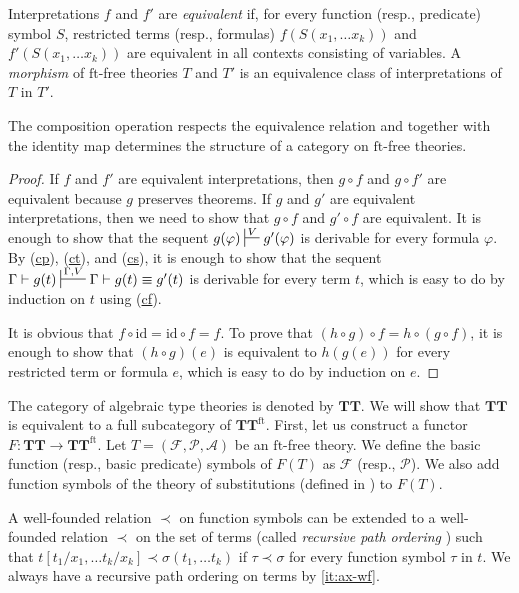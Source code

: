 \documentclass[reqno]{amsart}
\newcommand{\axref}[1]{(\hyperref[ax:#1]{#1})}
\theoremstyle{definition}
\theoremstyle{remark}
\newcommand{\fs}[1]{\mathrm{#1}}
\newcommand{\ft}{\fs{ft}}
\newcommand{\id}{\fs{id}}
\newcommand{\cat}[1]{\mathbf{#1}}
\newcommand{\algtt}{\cat{TT}}
\numberwithin{figure}{section}
\begin{document}
Interpretations $f$ and $f'$ are \emph{equivalent} if, for every function (resp., predicate) symbol $S$, restricted terms (resp., formulas) $f(S(x_1, \ldots x_k))$ and $f'(S(x_1, \ldots x_k))$ are equivalent in all contexts consisting of variables.
A \emph{morphism} of $\ft$-free theories $T$ and $T'$ is an equivalence class of interpretations of $T$ in $T'$.

\begin{prop}
The composition operation respects the equivalence relation and together with the identity map determines the structure of a category on $\ft$-free theories.
\end{prop}
\begin{proof}
If $f$ and $f'$ are equivalent interpretations, then $g \circ f$ and $g \circ f'$ are equivalent because $g$ preserves theorems.
If $g$ and $g'$ are equivalent interpretations, then we need to show that $g \circ f$ and $g' \circ f$ are equivalent.
It is enough to show that the sequent $g(\varphi) \sststile{}{V} g'(\varphi)$ is derivable for every formula $\varphi$.
By \axref{cp}, \axref{ct}, and \axref{cs}, it is enough to show that the sequent $\Gamma \vdash g(t) \sststile{}{\Gamma,V} \Gamma \vdash g(t) \equiv g'(t)$ is derivable for every term $t$, which is easy to do by induction on $t$ using \axref{cf}.

It is obvious that $f \circ \id = \id \circ f = f$.
To prove that $(h \circ g) \circ f = h \circ (g \circ f)$, it is enough to show that $(h \circ g)(e)$ is equivalent to $h(g(e))$ for every restricted term or formula $e$, which is easy to do by induction on $e$.
\end{proof}

The category of algebraic type theories is denoted by $\algtt$.
We will show that $\algtt$ is equivalent to a full subcategory of $\algtt^\ft$.
First, let us construct a functor $F : \algtt \to \algtt^\ft$.
Let $T = (\mathcal{F},\mathcal{P},\mathcal{A})$ be an $\ft$-free theory.
We define the basic function (resp., basic predicate) symbols of $F(T)$ as $\mathcal{F}$ (resp., $\mathcal{P}$).
We also add function symbols of the theory of substitutions (defined in \cite[Section~3.1]{alg-tt}) to $F(T)$.

A well-founded relation $\prec$ on function symbols can be extended to a well-founded relation $\prec$ on the set of terms (called \emph{recursive path ordering} \cite{mrpo}) such that $t[t_1/x_1, \ldots t_k/x_k] \prec \sigma(t_1, \ldots t_k)$ if $\tau \prec \sigma$ for every function symbol $\tau$ in $t$.
We always have a recursive path ordering on terms by \eqref{it:ax-wf}.
\end{document}
